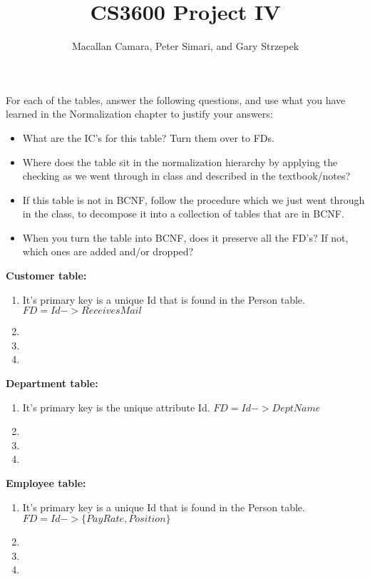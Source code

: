 \documentclass{article}
\title{CS3600 Project IV}
\author{Macallan Camara, Peter Simari, and Gary Strzepek}
\begin{document}
  \maketitle
  \par For each of the tables, answer the following questions, and use what you
  have learned in the Normalization chapter to justify your answers:
  \begin{itemize}
  	\item What are the IC's for this table? Turn them over to FDs.
  	\item Where does the table sit in the normalization hierarchy by applying the
  	checking as we went through in class and described in the textbook/notes?
  	\item If this table is not in BCNF, follow the procedure which we just went
  	through in the class, to decompose it into a collection of tables that are in
  	BCNF.
  	\item When you turn the table into BCNF, does it preserve all the FD's? If
  	not, which ones are added and/or dropped?
  \end{itemize}
  \par\textbf{Customer table:}
  \begin{enumerate}[label=\roman*]
  	\item It's primary key is a unique Id that is found in the Person table. \newline
    $FD = Id -> ReceivesMail$
  	\item
  	\item
  	\item
  \end{enumerate}
  \par\textbf{Department table:}
  \begin{enumerate}[label=\roman*]
  	\item It's primary key is the unique attribute Id. \newline
    $FD = Id -> DeptName$
  	\item
  	\item
  	\item
  \end{enumerate}
  \par\textbf{Employee table:}
  \begin{enumerate}[label=\roman*]
  	\item It's primary key is a unique Id that is found in the Person table. \newline
    $FD = Id -> \{PayRate, Position\}$
  	\item
  	\item
  	\item
  \end{enumerate}
\end{document}
